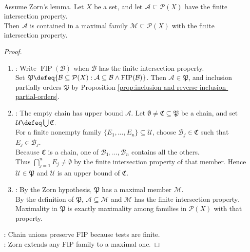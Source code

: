 \begin{lemma} \label{lem:maximal-fip-extension} \\
Assume Zorn's lemma. Let $X$ be a set, and let $\mathcal{A}\subseteq\mathcal{P}(X)$ have the finite intersection property.\\
Then $\mathcal{A}$ is contained in a maximal family $\mathcal{M}\subseteq\mathcal{P}(X)$ with the finite intersection property.
\begin{proof}
\begin{enumerate}[label=(\roman*)]
\setlength{\itemsep}{0pt}
\item {}: Write $\operatorname{FIP}(\mathcal{B})$ when $\mathcal{B}$ has the finite intersection property.\\
Set $\mathfrak{P}\defeq\{\mathcal{B}\subseteq\mathcal{P}(X):\mathcal{A}\subseteq\mathcal{B}\land\operatorname{FIP}(\mathcal{B})\}$. Then $\mathcal{A}\in\mathfrak{P}$, and inclusion partially orders $\mathfrak{P}$ by Proposition \ref{prop:inclusion-and-reverse-inclusion-partial-orders}.
\item {}: The empty chain has upper bound $\mathcal{A}$. Let $\emptyset\neq\mathfrak{C}\subseteq\mathfrak{P}$ be a chain, and set $\mathcal{U}\defeq\bigcup\limits\mathfrak{C}$.\\
For a finite nonempty family $\{E_1,\ldots,E_n\}\subseteq\mathcal{U}$, choose $\mathcal{B}_j\in\mathfrak{C}$ such that $E_j\in\mathcal{B}_j$.\\
Because $\mathfrak{C}$ is a chain, one of $\mathcal{B}_1,\ldots,\mathcal{B}_n$ contains all the others.\\
Thus $\bigcap_{j=1}^nE_j\neq\emptyset$ by the finite intersection property of that member. Hence $\mathcal{U}\in\mathfrak{P}$ and $\mathcal{U}$ is an upper bound of $\mathfrak{C}$.
\item {}: By the Zorn hypothesis, $\mathfrak{P}$ has a maximal member $\mathcal{M}$.\\
By the definition of $\mathfrak{P}$, $\mathcal{A}\subseteq\mathcal{M}$ and $\mathcal{M}$ has the finite intersection property.\\
Maximality in $\mathfrak{P}$ is exactly maximality among families in $\mathcal{P}(X)$ with that property.
\end{enumerate}
: Chain unions preserve FIP because tests are finite.\\
: Zorn extends any FIP family to a maximal one.
\end{proof}
\end{lemma}

